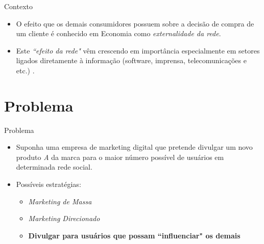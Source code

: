 \documentclass[t,14pt,mathserif,xcolor=table]{beamer}
\begin{document}
\begin{frame}{Contexto}

	\begin{itemize}
	
		\item O efeito que os demais consumidores possuem sobre a decisão de compra de um cliente é conhecido em Economia como \textit{externalidade da rede}{}. 
		
		\item Este \textit{``efeito da rede"} vêm crescendo em importância especialmente em setores ligados diretamente à informação (software, imprensa, telecomunicações e etc.) \cite{shapiro2013information}{}.
		
	\end{itemize}
	
\end{frame}


\section{Problema}

\begin{frame}{Problema}

	\begin{itemize}
	
		\item Suponha uma empresa de marketing digital que pretende divulgar um novo produto \emph{A} da marca  para o maior número possível de usuários em determinada rede social.
		
		\item Possíveis estratégias:
			\begin{itemize}
				\item \textit{Marketing de Massa}
				\item \textit{Marketing Direcionado}
				\item \textbf{Divulgar para usuários que possam ``influenciar" os demais}
			\end{itemize}
		
	\end{itemize}
	
\end{frame}

\end{document}
